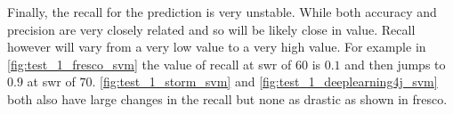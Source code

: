 Finally, the recall for the prediction is very unstable. While both accuracy and precision are very closely related and so will be likely close in value. Recall however will vary from a very low value to a very high value. For example in \autoref{fig:test_1_fresco_svm} the value of recall at \gls{swr} of $60$ is $0.1$ and then jumps to $0.9$ at \gls{swr} of $70$. \autoref{fig:test_1_storm_svm} and \autoref{fig:test_1_deeplearning4j_svm} both also have large changes in the recall but none as drastic as shown in fresco. 








